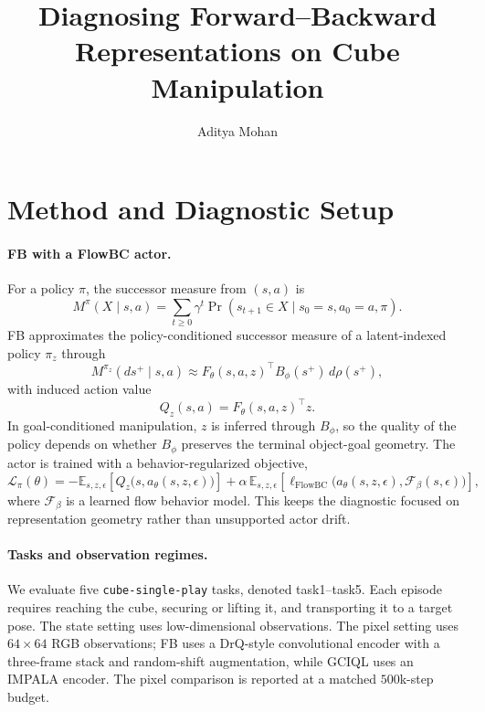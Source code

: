 \documentclass{article}
\title{Diagnosing Forward--Backward Representations on Cube Manipulation}
\author{Aditya Mohan}
\newcommand{\E}{\mathbb{E}}
\begin{document}
\maketitle

\section{Method and Diagnostic Setup}
\label{sec:setup}

\paragraph{FB with a FlowBC actor.}
For a policy $\pi$, the successor measure from $(s,a)$ is
\begin{equation}
M^{\pi}(X\mid s,a) = \sum_{t\geq 0}\gamma^t \Pr(s_{t+1}\in X\mid s_0=s,a_0=a,\pi).
\end{equation}
FB approximates the policy-conditioned successor measure of a latent-indexed policy $\pi_z$ through
\begin{equation}
M^{\pi_z}(ds^+\mid s,a) \approx F_\theta(s,a,z)^\top B_\phi(s^+)\,d\rho(s^+),
\end{equation}
with induced action value
\begin{equation}
Q_z(s,a)=F_\theta(s,a,z)^\top z.
\end{equation}
In goal-conditioned manipulation, $z$ is inferred through $B_\phi$, so the quality of the policy depends on whether $B_\phi$ preserves the terminal object-goal geometry. The actor is trained with a behavior-regularized objective,
\begin{equation}
\mathcal{L}_{\pi}(\theta)
=
-\E_{s,z,\epsilon}\left[Q_z\bigl(s,a_\theta(s,z,\epsilon)\bigr)\right]
+
\alpha\,\E_{s,z,\epsilon}\left[
\ell_{\mathrm{FlowBC}}\bigl(a_\theta(s,z,\epsilon),\mathcal{F}_{\beta}(s,\epsilon)\bigr)
\right],
\end{equation}
where $\mathcal{F}_{\beta}$ is a learned flow behavior model. This keeps the diagnostic focused on representation geometry rather than unsupported actor drift.

\paragraph{Tasks and observation regimes.}
We evaluate five \texttt{cube-single-play} tasks, denoted task1--task5. Each episode requires reaching the cube, securing or lifting it, and transporting it to a target pose. The state setting uses low-dimensional observations. The pixel setting uses $64\times64$ RGB observations; FB uses a DrQ-style convolutional encoder with a three-frame stack and random-shift augmentation, while GCIQL uses an IMPALA encoder. The pixel comparison is reported at a matched $500$k-step budget.
\end{document}
